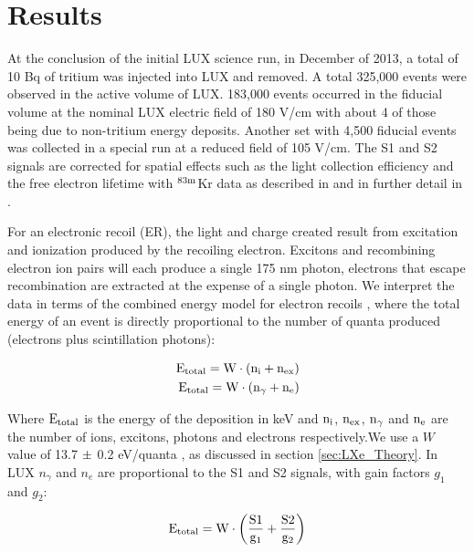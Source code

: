 \section{Results}

At the conclusion of the initial LUX science run, in December of 2013, a total of 10 Bq of tritium was injected into LUX and removed. A total 325,000 events were observed in the active volume of LUX. 183,000 events occurred in the fiducial volume at the nominal LUX electric field of 180 V/cm with about 4 of those being due to non-tritium energy deposits. Another set with 4,500 fiducial events was collected in a special run at a reduced field of 105 V/cm. The S1 and S2 signals are corrected for spatial effects such as the light collection efficiency and the free electron lifetime with $\rm ^{83m}$Kr data as described in \cite{lux-reanalysis} and in further detail in \cite{Dobi_Thesis}. 

For an electronic recoil (ER), the light and charge created result from excitation and ionization produced by the recoiling electron. Excitons and recombining electron ion pairs will each produce a single 175 nm photon, electrons that escape recombination are extracted at the expense of a single photon. We interpret the data in terms of the combined energy model for electron recoils \cite{Platzman}, where the total energy of an event is directly proportional to the number of quanta produced (electrons plus scintillation photons):

\begin{equation}
\begin{split}
\rm E_{total}= W \cdot (n_i + n_{ex}) \\
\rm E_{total} = W \cdot (n_{\gamma} + n_e )
\label{platzman_eq}
\end{split}
\end{equation}

\noindent
Where $\rm E_{total}$ is the energy of the deposition in keV and $\rm n_i$, $\rm n_{ex}$, $\rm n_\gamma$ and $\rm n_e$ are the number of ions, excitons, photons and electrons respectively.We use a $W$ value of 13.7 $\rm \pm$ 0.2 eV/quanta \cite{Dahl_Thesis}, as discussed in section \ref{sec:LXe_Theory}. In LUX $n_{\gamma}$ and $n_e$ are proportional to the S1 and S2 signals, with gain factors $g_1$ and $g_2$: 

\begin{equation}
\rm E_{total} = W \cdot \left(\frac{S1}{g_1} + \frac{S2}{g_2} \right)
\label{energy_eq}
\end{equation}

